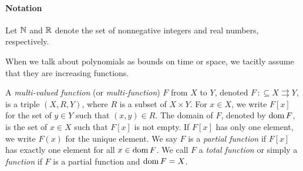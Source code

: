 \documentclass[envcountsame,orivec,oribibl]{llncs}
\newcommand{\pcolon}{\mathpunct{\,:\subseteq}}
\begin{document}


\paragraph{Notation}
Let $\mathbb N$ and $\mathbb R$ denote the set of nonnegative integers and 
real numbers, respectively.

When we talk about polynomials as bounds on time or space, 
we tacitly assume that they are increasing functions. 

A {\em multi-valued function} (or {\em multi-function}) $F$ from $X$ to $Y$,
denoted $F \pcolon X \rightrightarrows Y$,
is a triple $(X, R, Y)$, where $R$ is a subset of $X \times Y$.
For $x \in X$, we write $F[x]$ for the set of $y \in Y$ such that $(x,y) \in R$.
The domain of $F$, denoted by $\mathop{\rm dom} F$, is the set of $x \in X$ such that 
$F[x]$ is not empty.
If $F[x]$ has only one element, we write $F(x)$ for the unique element.
We say $F$ is a {\em partial function} if $F[x]$ has exactly one element for all
$x \in \mathop{\rm dom} F$.
We call $F$ a {\em total function} or simply a {\em function} 
if $F$ is a partial function and $\mathop{\rm dom} F = X$.

\end{document}

